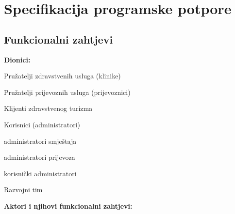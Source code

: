 \chapter{Specifikacija programske potpore}
		
	\section{Funkcionalni zahtjevi}
			\noindent \textbf{Dionici:}
			\begin{packed_enum}
				\item Pružatelji zdravstvenih usluga (klinike)
				\item Pružatelji prijevoznih usluga (prijevoznici)
				\item Klijenti zdravstvenog turizma
				\item Korisnici (administratori)
				\begin{packed_enum}
					\item[a)] administratori smještaja
					\item[b)] administratori prijevoza
					\item[c)] korisnički administratori
				\end{packed_enum}
				\item Razvojni tim
				
			\end{packed_enum}
			
			\noindent \textbf{Aktori i njihovi funkcionalni zahtjevi:}
			
